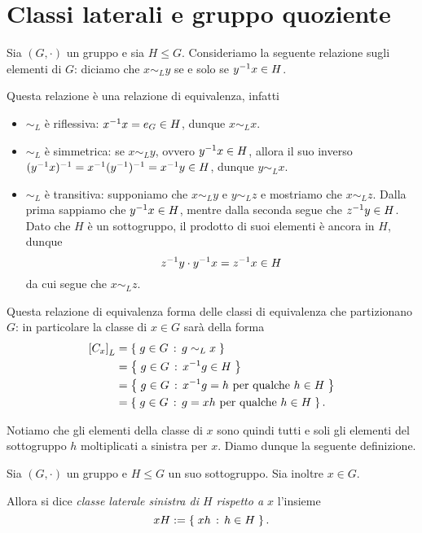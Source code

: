 \section{Classi laterali e gruppo quoziente}

Sia $(G, \cdot)$ un gruppo e sia $H \leq G$. Consideriamo la seguente relazione sugli elementi di $G$: diciamo che $x \sim_L y$ se e solo se $y^{-1} x \in H$.

Questa relazione è una relazione di equivalenza, infatti \begin{itemize}
    \item $\sim_L$ è riflessiva: $x^{-1} x = e_G \in H$, dunque $x \sim_L x$.
    \item $\sim_L$ è simmetrica: se $x \sim_L y$, ovvero $y^{-1} x \in H$, allora il suo inverso $(y^{-1} x)^{-1} = x^{-1} (y^{-1})^{-1} = x^{-1} y \in H$, dunque $y \sim_L x$.
    \item $\sim_L$ è transitiva: supponiamo che $x \sim_L y$ e $y \sim_L z$ e mostriamo che $x \sim_L z$. Dalla prima sappiamo che $y^{-1} x \in H$, mentre dalla seconda segue che $z^{-1} y \in H$. Dato che $H$ è un sottogruppo, il prodotto di suoi elementi è ancora in $H$, dunque \[
        z^{-1} y \cdot y^{-1} x = z^{-1} x \in H    
    \] da cui segue che $x \sim_L z$.
\end{itemize}

Questa relazione di equivalenza forma delle classi di equivalenza che partizionano $G$: in particolare la classe di $x \in G$ sarà della forma \begin{align*}
    \eqclass*{x}_L &= \set{g \in G \suchthat g \sim_L x}\\
    &= \set{g \in G \suchthat x\inv g \in H}\\
    &= \set{g \in G \suchthat x\inv g = h \text{ per qualche } h \in H}\\
    &= \set{g \in G \suchthat g = xh \text{ per qualche } h \in H}.
\end{align*}

Notiamo che gli elementi della classe di $x$ sono quindi tutti e soli gli elementi del sottogruppo $h$ moltiplicati a sinistra per $x$.
Diamo dunque la seguente definizione.
\begin{definition}
    Sia $(G, \cdot)$ un gruppo e $H \leq G$ un suo sottogruppo. Sia inoltre $x \in G$.
    
    Allora si dice \emph{classe laterale sinistra di $H$ rispetto a $x$} l'insieme \[
        xH := \left\{\;xh \,:\, h \in H\;\right\}. 
    \]
\end{definition}

